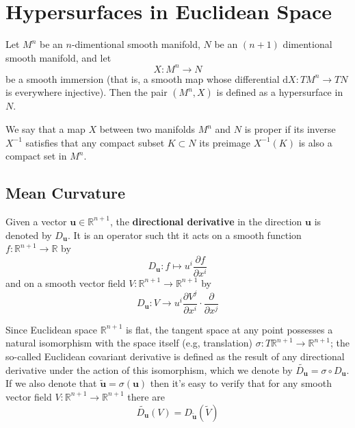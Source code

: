 \section{Hypersurfaces in Euclidean Space}

\begin{definition}[Hypersurface]\label{def:Hypersurface}
    Let $M^n$ be an $n$-dimentional smooth manifold, $N$ be an $(n+1)$ dimentional smooth manifold, and let
    \begin{equation}
        X:M^n\to N
    \end{equation}
    be a smooth immersion (that is, a smooth map whose differential $\mathrm{d}X:TM^n\to TN$ is everywhere injective). Then the pair $(M^n,X)$ is defined as a hypersurface in $N$.
\end{definition}

We say that a map $X$ between two manifolds $M^n$ and $N$ is proper if its inverse $X^{-1}$ satisfies that any compact subset $K\subset N$ its preimage $X^{-1}(K)$ is also a compact set in $M^n$.

\subsection{Mean Curvature}
Given a vector $\boldsymbol{u}\in\mathbb{R}^{n+1}$, the \textbf{directional derivative} in the direction $\boldsymbol{u}$ is denoted by $D_{\boldsymbol{u}}$. It is an operator such tht it acts on a smooth function $f:\mathbb{R}^{n+1}\to\mathbb{R}$ by
\begin{equation*}
    D_{\boldsymbol{u}}:f\mapsto u^i\frac{\partial f}{\partial x^i}
\end{equation*}
and on a smooth vector field $V:\mathbb{R}^{n+1}\to\mathbb{R}^{n+1}$ by
\begin{equation*}
    D_{\boldsymbol{u}}:V\to u^i\frac{\partial V^j}{\partial x^i}\cdot\frac{\partial}{\partial x^j}
\end{equation*}

Since Euclidean space $\mathbb{R}^{n+1}$ is flat, the tangent space at any point possesses a natural isomorphism with the space itself (e.g, translation) $\sigma:T\mathbb{R}^{n+1}\to\mathbb{R}^{n+1}$; the so-called Euclidean covariant derivative is defined as the result of any directional derivative under the action of this isomorphism, which we denote by $\widetilde{D_{\boldsymbol{u}}}=\sigma\circ D_{\boldsymbol{u}}$. If we also denote that $\tilde{\boldsymbol{u}}=\sigma(\boldsymbol{u})$ then it's easy to verify that for any smooth vector field $V:\mathbb{R}^{n+1}\to\mathbb{R}^{n+1}$ there are
\begin{equation*}
    \widetilde{D_{\boldsymbol{u}}}(V)=D_{\tilde{\boldsymbol{u}}}(\widetilde{V})
\end{equation*}

